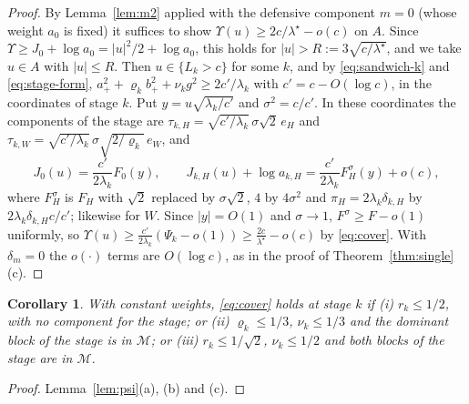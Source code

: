 \documentclass[11pt]{article}
\newtheorem{corollary}{Corollary}
\theoremstyle{definition}
\theoremstyle{remark}
\begin{document}
\begin{proof}
By Lemma~\ref{lem:m2} applied with the defensive component $m=0$ (whose weight $a_0$ is
fixed) it suffices to show
$\Upsilon(u)\ge2c/\lambda^\star-o(c)$ on $A$. Since $\Upsilon\ge J_0+\log a_0=|u|^2/2+\log a_0$,
this holds for $|u|>R:=3\sqrt{c/\lambda^\star}$, and we take $u\in A$ with $|u|\le R$.
Then $u\in\{L_k>c\}$ for some $k$, and by \eqref{eq:sandwich-k} and
\eqref{eq:stage-form}, $a_+^2+\varrho_kb_+^2+\nu_kg^2\ge2c'/\lambda_k$ with
$c'=c-O(\log c)$, in the coordinates of stage $k$. Put $y=u\sqrt{\lambda_k/c'}$ and
$\sigma^2=c/c'$. In these coordinates the components of the stage are
$\tau_{k,H}=\sqrt{c'/\lambda_k}\,\sigma\sqrt2\,e_H$ and
$\tau_{k,W}=\sqrt{c'/\lambda_k}\,\sigma\sqrt{2/\varrho_k}\,e_W$, and
\[
J_0(u)=\frac{c'}{2\lambda_k}F_0(y),\qquad
J_{k,H}(u)+\log a_{k,H}=\frac{c'}{2\lambda_k}F^\sigma_H(y)+o(c),
\]
where $F^\sigma_H$ is $F_H$ with $\sqrt2$ replaced by $\sigma\sqrt2$, $4$ by $4\sigma^2$ and
$\pi_H=2\lambda_k\delta_{k,H}$ by $2\lambda_k\delta_{k,H}c/c'$; likewise for $W$. Since
$|y|=O(1)$ and $\sigma\to1$, $F^\sigma\ge F-o(1)$ uniformly, so
$\Upsilon(u)\ge\frac{c'}{2\lambda_k}(\Psi_k-o(1))\ge\frac{2c}{\lambda^\star}-o(c)$ by
\eqref{eq:cover}. With $\delta_m=0$ the $o(\cdot)$ terms are $O(\log c)$, as in the proof
of Theorem~\ref{thm:single}(c).
\end{proof}

\begin{corollary}\label{cor:closed}
With constant weights, \eqref{eq:cover} holds at stage $k$ if (i) $r_k\le1/2$, with no
component for the stage; or (ii) $\varrho_k\le1/3$, $\nu_k\le1/3$ and the dominant block
of the stage is in $\mathcal M$; or (iii) $r_k\le1/\sqrt2$, $\nu_k\le1/2$ and both blocks
of the stage are in $\mathcal M$.
\end{corollary}

\begin{proof}
Lemma~\ref{lem:psi}(a), (b) and (c).
\end{proof}
\end{document}
